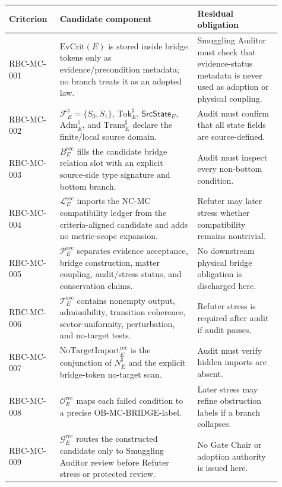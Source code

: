 \documentclass[11pt]{article}
\newcommand{\EvCrit}{\mathrm{EvCrit}}
\newcommand{\Tok}{\mathrm{Tok}}
\newcommand{\Adm}{\mathrm{Adm}}
\newcommand{\Trans}{\mathrm{Trans}}
\newcommand{\NoTargetImport}{\mathrm{NoTargetImport}}
\newcommand{\OBMCB}{\mathrm{OB}\mbox{-}\mathrm{MC}\mbox{-}\mathrm{BRIDGE}}
\begin{document}
\begin{longtable}{p{0.16\linewidth}p{0.46\linewidth}p{0.29\linewidth}}
\toprule
Criterion & Candidate component & Residual obligation \\
\midrule
RBC-MC-001 &
\(\EvCrit(E)\) is stored inside bridge tokens only as evidence/precondition
metadata; no branch treats it as an adopted law. &
Smuggling Auditor must check that evidence-status metadata is never used as
adoption or physical coupling. \\
\addlinespace
RBC-MC-002 &
\(\mathcal{F}_E^\sharp=\{S_0,S_1\}\), \(\Tok_E^\sharp\),
\(\mathsf{SrcState}_E\), \(\Adm_E^\sharp\), and \(\Trans_E^\sharp\) declare
the finite/local source domain. &
Audit must confirm that all state fields are source-defined. \\
\addlinespace
RBC-MC-003 &
\(B_E^{\mathrm{rec}}\) fills the candidate bridge relation slot with an
explicit source-side type signature and bottom branch. &
Audit must inspect every non-bottom condition. \\
\addlinespace
RBC-MC-004 &
\(\mathcal{L}_E^{\mathrm{rec}}\) imports the NC-MC compatibility ledger from
the criteria-aligned candidate and adds no metric-scope expansion. &
Refuter may later stress whether compatibility remains nontrivial. \\
\addlinespace
RBC-MC-005 &
\(\mathcal{P}_E^{\mathrm{rec}}\) separates evidence acceptance, bridge
construction, matter coupling, audit/stress status, and conservation claims. &
No downstream physical bridge obligation is discharged here. \\
\addlinespace
RBC-MC-006 &
\(\mathcal{T}_E^{\mathrm{rec}}\) contains nonempty output, admissibility,
transition coherence, sector-uniformity, perturbation, and no-target tests. &
Refuter stress is required after audit if audit passes. \\
\addlinespace
RBC-MC-007 &
\(\NoTargetImport_E^{\mathrm{rec}}\) is the conjunction of \(N_E^\sharp\) and
the explicit bridge-token no-target scan. &
Audit must verify hidden imports are absent. \\
\addlinespace
RBC-MC-008 &
\(\mathcal{O}_E^{\mathrm{rec}}\) maps each failed condition to a precise
\(\OBMCB\)-label. &
Later stress may refine obstruction labels if a branch collapses. \\
\addlinespace
RBC-MC-009 &
\(\mathcal{G}_E^{\mathrm{rec}}\) routes the constructed candidate only to
Smuggling Auditor review before Refuter stress or protected review. &
No Gate Chair or adoption authority is issued here. \\
\bottomrule
\end{longtable}
\end{document}
